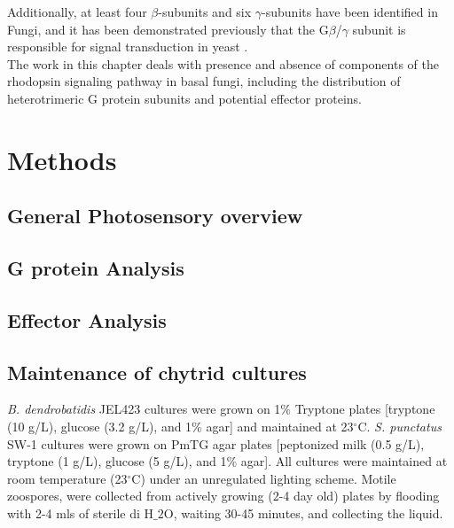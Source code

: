 \indent Additionally, at least four $\beta$-subunits and six $\gamma$-subunits have been identified \cite{Hepler1992} in Fungi, and it has been demonstrated previously that the G$\beta$/$\gamma$ subunit is responsible for signal transduction in yeast \cite{Bolker1998}.\\
\indent The work in this chapter deals with presence and absence of components of the rhodopsin signaling pathway in basal fungi, including the distribution of heterotrimeric G protein subunits and potential effector proteins.\\
\section{Methods}
\subsection{General Photosensory overview}
\subsection{G protein Analysis}
\subsection{Effector Analysis}
\subsection{Maintenance of chytrid cultures}
\textit{B. dendrobatidis} JEL423 cultures were grown on 1\% Tryptone plates [tryptone (10 g/L), glucose (3.2 g/L), and 1\% agar] and maintained at 23$^{\circ}$C. \textit{S. punctatus} SW-1 cultures were grown on PmTG agar plates [peptonized milk (0.5 g/L), tryptone (1 g/L), glucose (5 g/L), and 1\% agar]. All cultures were maintained at room temperature (23$^{\circ}$C) under an unregulated lighting scheme. Motile zoospores, were collected from actively growing (2-4 day old) plates by flooding with 2-4 mls of sterile di H$\_{2}$O, waiting 30-45 minutes, and collecting the liquid. \\

